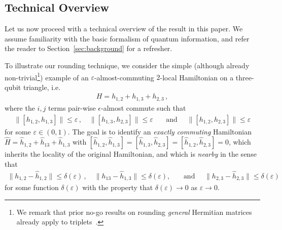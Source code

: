 \documentclass[11pt]{article}
\theoremstyle{plain}
\newcommand{\eps}{\varepsilon}
\begin{document}
\subsection{Technical Overview}
Let us now proceed with a technical overview of the result in this paper. We assume familiarity with the basic formalism of quantum information, and refer the reader to Section~\ref{sec:background} for a refresher.

To illustrate our rounding technique, we consider the simple (although already non-trivial\footnote{We remark that prior no-go results on rounding \emph{general} Hermitian matrices already apply to triplets~\cite{Davidson1985}.}) example of an $\eps$-almost-commuting $2$-local Hamiltonian on a three-qubit triangle, i.e.
\begin{align}
H = h_{1,2} + h_{1,3} + h_{2,3} \, , 
\end{align}
where the $i,j$ terms pair-wise $\epsilon$-almost commute such that 
\begin{align}
\| [h_{1,2},h_{1,3}]\| \leq \eps \, , \quad \| [h_{1,3},h_{2,3}]\| \leq \eps \quad\,\,\, \text{ and } \quad \| [h_{1,2},h_{2,3}]\| \leq \eps
\end{align}
for some $\eps \in (0,1)$. The goal is to identify an \emph{exactly commuting} Hamiltonian $\hat{H} = \hat h_{1,2} + \hat h_{13} + \hat h_{1,3}$ with $[\hat h_{1,2},\hat h_{1,3}] = [\hat h_{1,3},\hat h_{2,3}] = [\hat h_{1,2},\hat h_{2,3}] = 0$, which inherits the locality of the original Hamiltonian, and which is \emph{nearby} in the sense that
\begin{align}
\| h_{1,2} - \hat h_{1,2}\| \leq \delta(\eps) \, , \quad\| h_{13} - \hat h_{1,3}\| \leq \delta(\eps), \quad\,\,\, \text{ and } \quad \| h_{2,3} - \hat h_{2,3}\| \leq \delta(\eps)
\end{align}
for some function $\delta(\eps)$ with the property that $\delta(\eps) \rightarrow 0$ as $\eps \rightarrow 0$.
\end{document}
